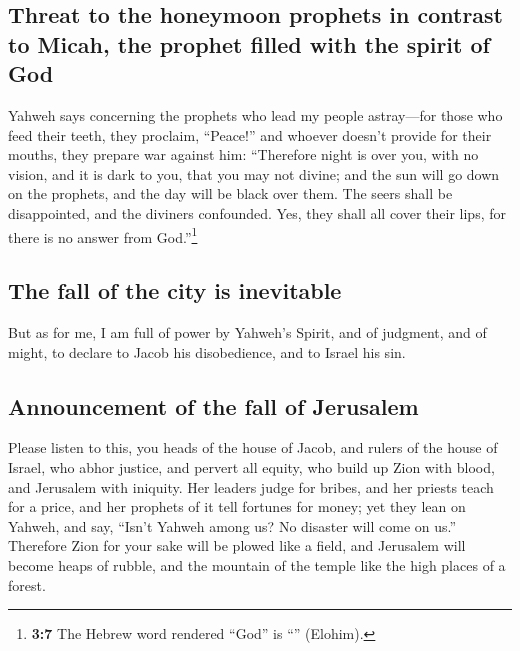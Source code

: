 \hypertarget{threat-to-the-honeymoon-prophets-in-contrast-to-micah-the-prophet-filled-with-the-spirit-of-god}{%
\subsection{Threat to the honeymoon prophets in contrast to Micah, the
prophet filled with the spirit of
God}\label{threat-to-the-honeymoon-prophets-in-contrast-to-micah-the-prophet-filled-with-the-spirit-of-god}}

 Yahweh says concerning the prophets who lead my people
astray---for those who feed their teeth, they proclaim, ``Peace!'' and
whoever doesn't provide for their mouths, they prepare war against him:
 ``Therefore night is over you, with no vision, and it is
dark to you, that you may not divine; and the sun will go down on the
prophets, and the day will be black over them.  The seers
shall be disappointed, and the diviners confounded. Yes, they shall all
cover their lips, for there is no answer from God.''\footnote{\textbf{3:7}
  The Hebrew word rendered ``God'' is ``'' (Elohim).}

\hypertarget{the-fall-of-the-city-is-inevitable}{%
\subsection{The fall of the city is
inevitable}\label{the-fall-of-the-city-is-inevitable}}

 But as for me, I am full of power by Yahweh's Spirit, and
of judgment, and of might, to declare to Jacob his disobedience, and to
Israel his sin.

\hypertarget{announcement-of-the-fall-of-jerusalem}{%
\subsection{Announcement of the fall of
Jerusalem}\label{announcement-of-the-fall-of-jerusalem}}

 Please listen to this, you heads of the house of Jacob,
and rulers of the house of Israel, who abhor justice, and pervert all
equity,  who build up Zion with blood, and Jerusalem with
iniquity.  Her leaders judge for bribes, and her priests
teach for a price, and her prophets of it tell fortunes for money; yet
they lean on Yahweh, and say, ``Isn't Yahweh among us? No disaster will
come on us.''  Therefore Zion for your sake will be
plowed like a field, and Jerusalem will become heaps of rubble, and the
mountain of the temple like the high places of a forest.

